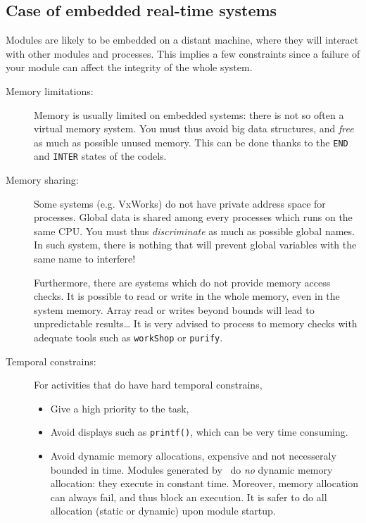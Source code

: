 \subsection{Case of embedded real-time systems}

Modules are likely  to be embedded on  a distant machine, where they will
interact  with other modules  and     processes.   This implies a     few
constraints since a  failure of your module can  affect the integrity  of
the whole system.

\begin{description}
\item[Memory limitations:]
Memory is  usually limited on  embedded systems: there is  not so often a
virtual memory system. You must thus avoid big  data structures, and {\em
free} as much as  possible unused memory. This  can be done thanks to the
\texttt{END} and \texttt{INTER} states of the codels.

\item[Memory sharing:]
Some  systems (e.g. VxWorks)   do not  have   private address  space  for
processes. Global data is shared among every processes  which runs on the
same CPU. You  must thus \emph{discriminate} as  much  as possible global
names.  In   such system, there   is nothing  that will   prevent  global
variables with the same name to interfere!

Furthermore, there are systems which do not provide memory access checks.
It is possible to  read or write in the whole memory,  even in the system
memory. Array  read or  writes beyond bounds  will lead  to unpredictable
results\ldots{}  It is  very advised  to  process to  memory checks  with
adequate tools such as \texttt{workShop} or \texttt{purify}.

\item[Temporal constrains:]

For activities that do have hard temporal constrains,
\begin{itemize}
\item Give a high priority to the task,
\item Avoid displays such as \texttt{printf()}, which can be very time
consuming.
\item Avoid dynamic memory allocations, expensive and not necesseraly
bounded in time.  Modules generated by \GenoM\ do \emph{no} dynamic memory
allocation: they execute in  constant time.  Moreover, memory  allocation
can always fail, and  thus block  an execution.  It  is  safer to do  all
allocation (static or dynamic) upon module startup.
\end{itemize} 


\end{description}

